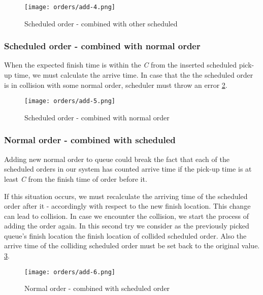 			\begin{figure}[h]\centering
				\texttt{[image: orders/add-4.png]}
				\caption{Scheduled order - combined with other scheduled} 
				\label{order-process-scheduled-order-combined-with-scheduled}
			\end{figure} 
		
	\subsubsection{Scheduled order - combined with normal order}
		When the expected finish time is within the \textit{C} from the inserted scheduled pick-up time, we must calculate the arrive time. In case that the the scheduled order is in collision with some normal order, scheduler must throw an error \ref{order-process-scheduled-order-combined-with-normal}.
		 
		\begin{figure}[h]\centering
			\texttt{[image: orders/add-5.png]}
			\caption{Scheduled order - combined with normal order} 
			\label{order-process-scheduled-order-combined-with-normal}
		\end{figure} 
	
			
	\subsubsection{Normal order - combined with scheduled}
	Adding new normal order to queue could break the fact that each of the scheduled orders in our system has counted arrive time if the pick-up time is at least \textit{C} from the finish time of order before it.
	
	If this situation occurs, we must recalculate the arriving time of the scheduled order after it -  accordingly with respect to the new finish location. This change can lead to collision. In case we encounter the collision, we start the process of adding the order again. In this second try we consider as the previously picked queue's finish location the finish location of collided scheduled order. Also the arrive time of the colliding scheduled order must be set back to the original value. 
	 \ref{order-process-normal-order-combined-with-scheduled}.
	
	\begin{figure}[h]\centering
		\texttt{[image: orders/add-6.png]}
		\caption{Normal order - combined with scheduled order} 
		\label{order-process-normal-order-combined-with-scheduled}
	\end{figure} 

